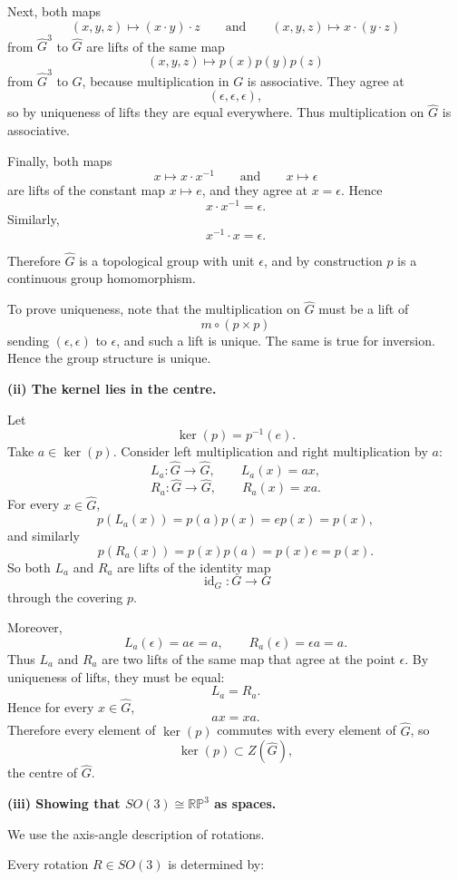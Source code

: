 \begin{solution}
Next, both maps
\[
(x,y,z)\mapsto (x\cdot y)\cdot z
\qquad\text{and}\qquad
(x,y,z)\mapsto x\cdot (y\cdot z)
\]
from \(\widehat{G}^3\) to \(\widehat{G}\) are lifts of the same map
\[
(x,y,z)\mapsto p(x)p(y)p(z)
\]
from \(\widehat{G}^3\) to \(G\), because multiplication in \(G\) is associative. They agree at
\[
(\epsilon,\epsilon,\epsilon),
\]
so by uniqueness of lifts they are equal everywhere. Thus multiplication on \(\widehat{G}\) is associative.

Finally, both maps
\[
x\mapsto x\cdot x^{-1}
\qquad\text{and}\qquad
x\mapsto \epsilon
\]
are lifts of the constant map \(x\mapsto e\), and they agree at \(x=\epsilon\). Hence
\[
x\cdot x^{-1}=\epsilon.
\]
Similarly,
\[
x^{-1}\cdot x=\epsilon.
\]

Therefore \(\widehat{G}\) is a topological group with unit \(\epsilon\), and by construction \(p\) is a continuous group homomorphism.

To prove uniqueness, note that the multiplication on \(\widehat{G}\) must be a lift of
\[
m\circ (p\times p)
\]
sending \((\epsilon,\epsilon)\) to \(\epsilon\), and such a lift is unique. The same is true for inversion. Hence the group structure is unique.

\textbf{(ii) The kernel lies in the centre.}

Let
\[
\ker(p)=p^{-1}(e).
\]
Take \(a\in \ker(p)\). Consider left multiplication and right multiplication by \(a\):
\[
L_a:\widehat{G}\to \widehat{G},
\qquad
L_a(x)=ax,
\]
\[
R_a:\widehat{G}\to \widehat{G},
\qquad
R_a(x)=xa.
\]
For every \(x\in \widehat{G}\),
\[
p(L_a(x))=p(a)p(x)=ep(x)=p(x),
\]
and similarly
\[
p(R_a(x))=p(x)p(a)=p(x)e=p(x).
\]
So both \(L_a\) and \(R_a\) are lifts of the identity map
\[
\operatorname{id}_G:G\to G
\]
through the covering \(p\).

Moreover,
\[
L_a(\epsilon)=a\epsilon=a,
\qquad
R_a(\epsilon)=\epsilon a=a.
\]
Thus \(L_a\) and \(R_a\) are two lifts of the same map that agree at the point \(\epsilon\). By uniqueness of lifts, they must be equal:
\[
L_a=R_a.
\]
Hence for every \(x\in \widehat{G}\),
\[
ax=xa.
\]
Therefore every element of \(\ker(p)\) commutes with every element of \(\widehat{G}\), so
\[
\ker(p)\subset Z(\widehat{G}),
\]
the centre of \(\widehat{G}\).

\textbf{(iii) Showing that \(SO(3)\cong \mathbb{RP}^3\) as spaces.}

We use the axis-angle description of rotations.

Every rotation \(R\in SO(3)\) is determined by:


\end{solution}

